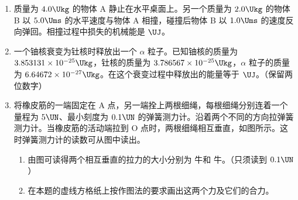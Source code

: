 \documentclass[\gkver]{gaokaozhenti}
\begin{document}
\begin{enumerate}
{（3）若电子是在 $t=\frac{3}{8}T$ 时刻进入，则电子先向 B 板运动，然后再折向 A 板运动，但向 A 板运动到小孔时，速度仍在增大，故电子只能从 A 孔返回，不能打在 B 板上，故 C 错误；

（4）若电子是在 $t=\frac{1}{2}T$ 时刻进入电场，电子开始就受力向 A 板返回，不能在电场中运动，故 D 错误。
}

\item
质量为 $4.0\Ukg$ 的物体 A 静止在水平桌面上。另一个质量为 $2.0\Ukg$ 的物体 B 以 $5.0\Ums$ 的水平速度与物体 A 相撞，碰撞后物体 B 以 $1.0\Ums$ 的速度反向弹回。相撞过程中损失的机械能是 $\UJ$。



\item
一个铀核衰变为钍核时释放出一个 $\alpha$ 粒子。已知铀核的质量为 $3.853131 \times 10^{-25}\Ukg$，钍核的质量为 $3.786567 \times 10^{-25}\Ukg$，$\alpha$ 粒子的质量为 $6.64672 \times 10^{-27}\Ukg$。在这个衰变过程中释放出的能量等于 $\UJ$。（保留两位数字）



\item
将橡皮筋的一端固定在 A 点，另一端拴上两根细绳，每根细绳分别连着一个量程为 $5\UN$、最小刻度为 $0.1\UN$ 的弹簧测力计。沿着两个不同的方向拉弹簧测力计。当橡皮筋的活动端拉到 O 点时，两根细绳相互垂直，如图所示。这时弹簧测力计的读数可从图中读出。
\begin{enumerate}
	\item
	由图可读得两个相互垂直的拉力的大小分别为  牛和  牛。（只须读到 $0.1\UN$）
	\item
	在本题的虚线方格纸上按作图法的要求画出这两个力及它们的合力。
\end{enumerate}


\end{enumerate}
\end{document}
